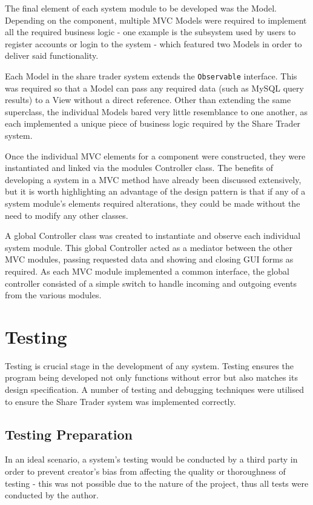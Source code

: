 \documentclass[12pt, a4paper,titlepage]{article}
\begin{document}
The final element of each system module to be developed was the Model. 
Depending on the component, multiple MVC Models were required to implement all
the required business logic - one example is the subsystem used by users to
register accounts or login to the system - which featured two Models in order
to deliver said functionality.

Each Model in the share trader system extends the {\tt Observable} interface. 
This was required so that a Model can pass any required data (such as MySQL
query results) to a View without a direct reference.
Other than extending the same superclass, the individual Models bared very
little resemblance to one another, as each implemented a unique piece of
business logic required by the Share Trader system.

Once the individual MVC elements for a component were constructed, they were
instantiated and linked via the modules Controller class. 
The benefits of developing a system in a MVC method have already been discussed
extensively, but it is worth highlighting an advantage of the design pattern
is that if any of a system module’s elements  required alterations, they could
be made without the need to modify any other classes.

A global Controller class was created to instantiate and observe each
individual system module. 
This global Controller acted as a mediator between the other MVC modules,
passing requested data and showing and closing GUI forms as required.  
As each MVC module implemented a common interface, the global controller
consisted of a simple switch to handle incoming and outgoing events from the
various modules.


\section{Testing}
Testing is crucial stage in the development of any system.
Testing ensures the program being developed not only functions without error
but also matches its design specification. 
A number of testing and debugging techniques were utilised to ensure the Share
Trader system was implemented correctly.

\subsection{Testing Preparation}
In an ideal scenario, a system’s testing would be conducted by a third party
in order to prevent creator's bias from affecting the quality or thoroughness
of testing - this was not possible due to the nature of the project, thus all
tests were conducted by the author.
\end{document}
